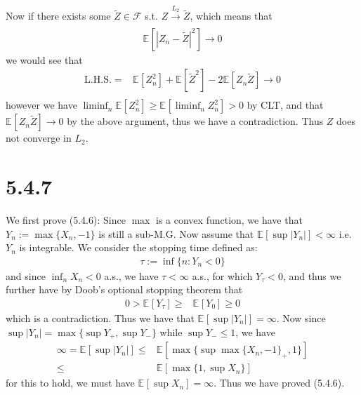 \documentclass[11pt,a4paper]{ctexart}
\numberwithin{equation}{section}%
\newcommand{\F}{\mathcal{F}}
\begin{document}
Now if there exists some $ \tilde{Z} \in \F  $ s.t. $ Z\xrightarrow[]{L_2} \tilde{Z} $, which means that
\begin{align*}
    \mathbb{E}_{  }\left[ \left\vert Z_n-\tilde{Z} \right\vert ^2 \right] \to 0 
\end{align*}
we would see that
\begin{align*}
     \mathrm{L.H.S.} =& \mathbb{E}_{  }\left[ Z_n^2 \right] + \mathbb{E}_{  }\left[ \tilde{Z}^2 \right] - 2\mathbb{E}_{  }\left[ Z_n\tilde{Z} \right] \to 0\\
\end{align*}
however we have $ \liminf_n \mathbb{E}_{  }\left[ Z_n^2 \right]  \geq \mathbb{E}_{  }\left[ \liminf_n Z_n^2 \right] >0 $ by CLT, and that $ \mathbb{E}_{  }\left[ Z_n\tilde{Z} \right] \to 0 $ by the above argument, thus we have a contradiction. Thus $ Z $ does not converge in $ L_2 $. 



\section{5.4.7}

We first prove (5.4.6): Since $ \max $ is a convex function, we have that $ Y_n:=\max\{X_n,-1\} $ is still a sub-M.G. Now assume that $ \mathbb{E}_{  }\left[ \sup \left\vert Y_n \right\vert  \right]  <\infty $ i.e. $ Y_n $ is integrable. We consider the stopping time defined as:
\begin{align*}
    \tau:= \inf\{n: Y_n<0\} 
\end{align*}
and since $ \inf_n X_n <0 $ a.s., we have $ \tau <\infty $ a.s., for which $ Y_\tau <0 $, and thus we further have by Doob's optional stopping theorem that
\begin{align*}
    0>\mathbb{E}_{  }\left[ Y_\tau \right] \geq & \mathbb{E}_{  }\left[ Y_0 \right] \geq 0
\end{align*}
which is a contradiction. Thus we have that $ \mathbb{E}_{  }\left[ \sup \left\vert Y_n \right\vert  \right]  =\infty $. Now since $ \sup \left\vert Y_n \right\vert  = \max \{ \sup Y_+, \sup Y_- \} $ while $ \sup Y_- \leq 1 $, we have
\begin{align*}
     \infty = \mathbb{E}_{  }\left[ \sup\left\vert Y_n \right\vert  \right]  \leq & \mathbb{E}_{  }\left[ \max \{ \sup \max\{X_n,-1\}_+, 1 \}\right] \\
     \leq& \mathbb{E}_{  }\left[ \max\{ 1, \sup{X_n}\} \right] 
\end{align*}
for this to hold, we must have $ \mathbb{E}_{  }\left[ \sup X_n \right] =\infty $. Thus we have proved (5.4.6).
\end{document}
